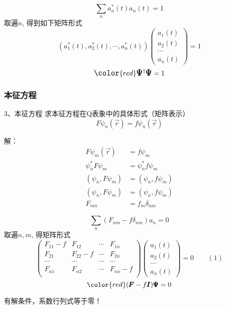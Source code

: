 \begin{frame} 
    $$  \sum_{n} a_n ^*(t) a_n(t) =1 $$
    取遍$n$, 得到如下矩阵形式\\
    $$ (a_1 ^*(t), a_2 ^*(t),\cdots,a_n^*(t) )
    \begin{pmatrix}
        a_1(t)\\
        a_2(t)\\
        \cdots \\
        a_n(t)
    \end{pmatrix}
    =1 $$ \vspace{1.0em} 
    $$ \large \color{red} \pmb {\Psi} ^{\dagger } \pmb {\Psi} =1 $$

\end{frame}

\begin{frame} 
    \frametitle{本征方程}
    \begin{tcolorbox1}{3、本征方程}
        求本征方程在Q表象中的具体形式（矩阵表示）
        $$ F\psi_n (\vec{r}) =f \psi_n (\vec{r})$$
    \end{tcolorbox1}
    \alert{解：} 
    \begin{equation*}
        \begin{split}
            F\psi_m (\vec{r}) &=f \psi_m \\
            \psi_n ^*  F\psi_m &=\psi_n ^* f \psi_m\\
            (\psi_n, F\psi_m )&=(\psi_n, f \psi_m)\\
            (\psi_n, F\psi_m )&=(\psi_n, f \psi_m)\\
            F_{nm} &=f_m \delta_{nm}
        \end{split} 
    \end{equation*}
\end{frame}

\begin{frame} 
    $$ \sum_n (F_{nm} -f \delta_{nm})a_n=0 $$
    取遍$n,m$, 得矩阵形式\\            
    $$\begin{pmatrix}
        F_{11}-f & F_{12} & \cdots & F_{1n} \\
        F_{21} & F_{22}-f & \cdots & F_{2n} \\
        \cdots & \cdots &  \cdots& \cdots\\
         F_{n1} & F_{n2} & \cdots & F_{nn}-f \\
     \end{pmatrix}
     \begin{pmatrix}
         a_1(t)\\
         a_2(t)\\
         \cdots \\
         a_n(t)
     \end{pmatrix}
     =0 \qquad (1)$$
     $$ \color{red} (\pmb F -f \pmb I) \pmb \Psi =0 $$

    有解条件，系数行列式等于零！
\end{frame}

